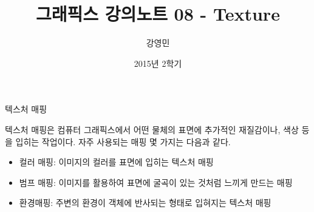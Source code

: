 \documentclass{beamer}
\title[3D 그래픽스 프로그래밍]{그래픽스 강의노트 08 - Texture}
\author{강영민}
\institute{동명대학교}
\date{2015년 2학기}
\begin{document}
\begin{frame}
  \titlepage
\end{frame}





\begin{frame}[fragile]{텍스처 매핑}

텍스처 매핑은 컴퓨터 그래픽스에서 어떤 물체의 표면에 추가적인 재질감이나, 색상 등을 입히는 작업이다.  자주 사용되는 매핑 몇 가지는 다음과 같다.

\begin{itemize}
\item 컬러 매핑: 이미지의 컬러를 표면에 입히는 텍스처 매핑
\item 범프 매핑: 이미지를 활용하여 표면에 굴곡이 있는 것처럼 느끼게 만드는 매핑
\item 환경매핑: 주변의 환경이 객체에 반사되는 형태로 입혀지는 텍스처 매핑
\end{itemize}

\end{frame}
\end{document}
